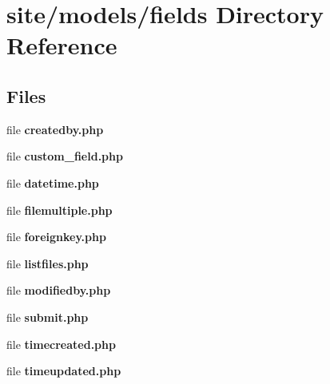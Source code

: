 \section{site/models/fields Directory Reference}
\label{dir_8e6b1f38876c154890f83f0198f002ec}
\subsection*{Files}
\begin{DoxyCompactItemize}
\item 
file \textbf{ createdby.\+php}
\item 
file \textbf{ custom\+\_\+field.\+php}
\item 
file \textbf{ datetime.\+php}
\item 
file \textbf{ filemultiple.\+php}
\item 
file \textbf{ foreignkey.\+php}
\item 
file \textbf{ listfiles.\+php}
\item 
file \textbf{ modifiedby.\+php}
\item 
file \textbf{ submit.\+php}
\item 
file \textbf{ timecreated.\+php}
\item 
file \textbf{ timeupdated.\+php}
\end{DoxyCompactItemize}
